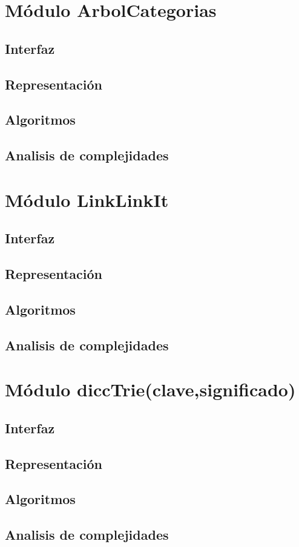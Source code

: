 \documentclass[12pt, a4paper]{article}
\begin{document}
\maketitle
\tableofcontents
\newpage

\section{Módulo ArbolCategorias} 
\subsection{Interfaz}

\subsection{Representaci\'on}

\subsection{Algoritmos}

\subsection{Analisis de complejidades}

\newpage 
\section{M\'odulo LinkLinkIt} 
\subsection{Interfaz}

\subsection{Representaci\'on}

\subsection{Algoritmos}

\subsection{Analisis de complejidades}

\newpage 
\section{M\'odulo diccTrie(clave,significado)}
\subsection{Interfaz}

\subsection{Representaci\'on}

\subsection{Algoritmos}

\subsection{Analisis de complejidades}

\newpage
\end{document}
